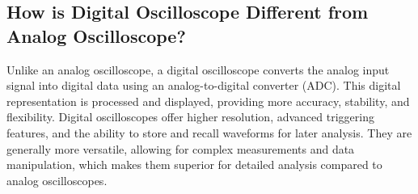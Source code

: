 \subsection{How is Digital Oscilloscope Different from Analog Oscilloscope?}

Unlike an analog oscilloscope, a digital oscilloscope converts the analog input signal into digital data using an analog-to-digital converter (ADC). This digital representation is processed and displayed, providing more accuracy, stability, and flexibility. Digital oscilloscopes offer higher resolution, advanced triggering features, and the ability to store and recall waveforms for later analysis. They are generally more versatile, allowing for complex measurements and data manipulation, which makes them superior for detailed analysis compared to analog oscilloscopes.
